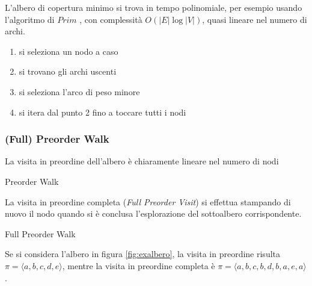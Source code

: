 L'albero di copertura minimo si trova in tempo polinomiale, per esempio usando l'algoritmo di $Prim$ \cite{Prim57}, con complessità $O \left( |E| \log |V| \right)$, quasi lineare nel numero di archi.
\begin{enumerate}[noitemsep,parsep=0pt,partopsep=0pt,topsep=0pt]
    \item si seleziona un nodo a caso
    \item si trovano gli archi uscenti
    \item si seleziona l'arco di peso minore
    \item si itera dal punto 2 fino a toccare tutti i nodi
\end{enumerate}

\subsubsection{(Full) Preorder Walk}
La visita in preordine dell'albero è chiaramente lineare nel numero di nodi
\begin{algorithm}[H]
\caption{Preorder Walk}\label{alg:preorderwalk}
\begin{algorithmic}[1]
        \State {}
            \State {}
        \EndFor
        \EndIf
    \EndProcedure
\end{algorithmic}
\end{algorithm}

La visita in preordine completa (\emph{Full Preorder Visit}) si effettua stampando di nuovo il nodo quando si è conclusa l'esplorazione del sottoalbero corrispondente.
\begin{algorithm}[H]
\caption{Full Preorder Walk}\label{alg:fullpreorderwalk}
\begin{algorithmic}[1]
        \State {}
            \State {}
            \State {}
        \EndFor
        \EndIf
    \EndProcedure
\end{algorithmic}
\end{algorithm}

Se si considera l'albero in figura \ref{fig:exalbero}, la visita in preordine risulta 
$ \pi = \langle a,b,c,d,e \rangle$,
mentre la visita in preordine completa è
$ \pi = \langle a,b,c,b,d,b,a,e,a \rangle$.

